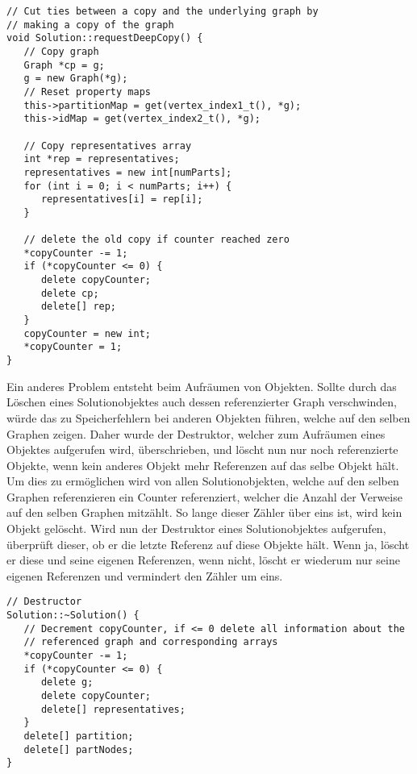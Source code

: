 \singlespacing
\begin{lstlisting}[caption={Die Methode \texttt{requestDeepCopy} of the Solution class},label={lst:deepcopy}]
// Cut ties between a copy and the underlying graph by 
// making a copy of the graph
void Solution::requestDeepCopy() {
   // Copy graph
   Graph *cp = g;
   g = new Graph(*g);
   // Reset property maps
   this->partitionMap = get(vertex_index1_t(), *g);
   this->idMap = get(vertex_index2_t(), *g);

   // Copy representatives array
   int *rep = representatives;
   representatives = new int[numParts];
   for (int i = 0; i < numParts; i++) {
      representatives[i] = rep[i];
   }

   // delete the old copy if counter reached zero
   *copyCounter -= 1;
   if (*copyCounter <= 0) {
      delete copyCounter;
      delete cp;
      delete[] rep;
   }
   copyCounter = new int;
   *copyCounter = 1;
}
\end{lstlisting}

Ein anderes Problem entsteht beim Aufräumen von Objekten. Sollte durch das Löschen eines Solutionobjektes auch dessen referenzierter Graph verschwinden, würde das zu Speicherfehlern bei anderen Objekten führen, 
welche auf den selben Graphen zeigen. Daher wurde der Destruktor, welcher zum Aufräumen eines Objektes aufgerufen wird, überschrieben, und löscht nun nur noch referenzierte Objekte, wenn kein anderes Objekt
mehr Referenzen auf das selbe Objekt hält. Um dies zu ermöglichen wird von allen Solutionobjekten, welche auf den selben Graphen referenzieren ein Counter referenziert, welcher die Anzahl der
Verweise auf den selben Graphen mitzählt. So lange dieser Zähler über eins ist, wird kein Objekt gelöscht. Wird nun der Destruktor eines Solutionobjektes aufgerufen, überprüft dieser, ob er die letzte
Referenz auf diese Objekte hält. Wenn ja, löscht er diese und seine eigenen Referenzen, wenn nicht, löscht er wiederum nur seine eigenen Referenzen und vermindert den Zähler um eins.

\singlespacing
\begin{lstlisting}[caption={Der Destruktor der Solutionklasse mit Rücksichtnahme auf eventuelle verbleibende Referenzen},label={lst:destruct}]
// Destructor
Solution::~Solution() {
   // Decrement copyCounter, if <= 0 delete all information about the 
   // referenced graph and corresponding arrays
   *copyCounter -= 1;
   if (*copyCounter <= 0) {
      delete g;
      delete copyCounter;
      delete[] representatives;
   }
   delete[] partition;
   delete[] partNodes;
}
\end{lstlisting}

